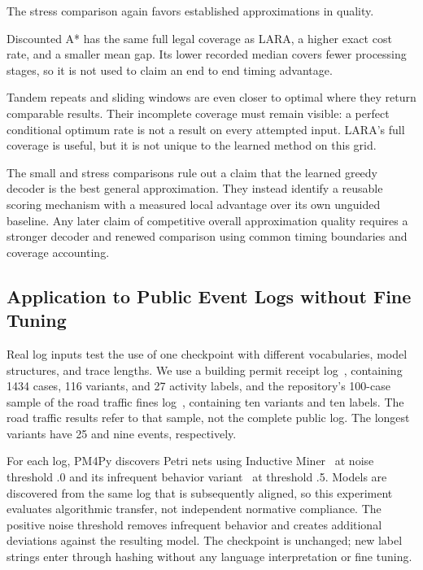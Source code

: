 The stress comparison again favors established approximations in quality. \begin{revised}Discounted A* has the same full legal coverage as LARA, a higher exact cost rate, and a smaller mean gap. Its lower recorded median covers fewer processing stages, so it is not used to claim an end to end timing advantage.\end{revised} Tandem repeats and sliding windows are even closer to optimal where they return comparable results. Their incomplete coverage must remain visible: a perfect conditional optimum rate is not a result on every attempted input. LARA's full coverage is useful, but it is not unique to the learned method on this grid.

The small and stress comparisons rule out a claim that the learned greedy decoder is the best general approximation. They instead identify a reusable scoring mechanism with a measured local advantage over its own unguided baseline. Any later claim of competitive overall approximation quality requires a stronger decoder and renewed comparison using common timing boundaries and coverage accounting.

\subsection{Application to Public Event Logs without Fine Tuning}
\label{sec:real}

Real log inputs test the use of one checkpoint with different vocabularies, model structures, and trace lengths. We use a building permit receipt log~\cite{ReceiptLog}, containing 1434 cases, 116 variants, and 27 activity labels, and the repository's 100-case sample of the road traffic fines log~\cite{RoadTrafficLog}, containing ten variants and ten labels. The road traffic results refer to that sample, not the complete public log. The longest variants have 25 and nine events, respectively.

For each log, PM4Py discovers Petri nets using Inductive Miner~\cite{Leemans2013} at noise threshold .0 and its infrequent behavior variant~\cite{Leemans2014} at threshold .5. Models are discovered from the same log that is subsequently aligned, so this experiment evaluates algorithmic transfer, not independent normative compliance. The positive noise threshold removes infrequent behavior and creates additional deviations against the resulting model. The checkpoint is unchanged; new label strings enter through hashing without any language interpretation or fine tuning.

